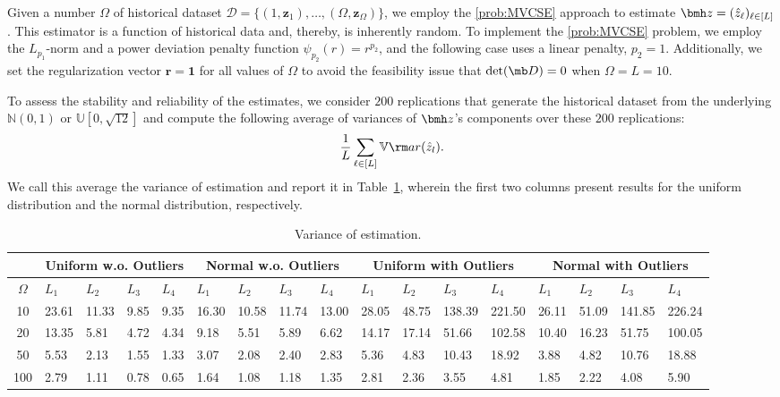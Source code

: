 \documentclass[mnsc, nonblindrev]{informswp}
\newcommand{\1}[1]{\mathds{1}{\left(#1\right)}}
\begin{document}
\begin{appendices}
Given a number $\Omega$ of historical dataset $\mathcal{D} = \{(1,\bm z_1), \dots, (\Omega,\bm z_\Omega)\}$, we employ the \ref{prob:MVCSE} approach to estimate $\bmh z = (\hat z_\ell)_{\ell \in [L]}$. This estimator is a function of historical data and, thereby, is inherently random. To implement the \ref{prob:MVCSE} problem, we employ the $L_{p_1}$-norm and a power deviation penalty function $\psi_{p_2}(r) = r^{p_2}$, and the following case uses a linear penalty, \ie $p_2 =1$. Additionally, we set the regularization vector $\bm r = \bm 1$ for all values of $\Omega$ to avoid the feasibility issue that $\det(\mb D) = 0$ when $\Omega = L = 10$.

To assess the stability and reliability of the estimates, we consider $200$ replications that generate the historical dataset from the underlying $\mathbb{N}(0,1)$ or $\mathbb{U}[0,\sqrt{12}]$ and compute the following average of variances of $\bmh z$'s components over these $200$ replications:
\[
\frac{1}{L} \sum_{\ell \in [L]} \mathbb{V}{\rm ar}(\hat{z}_l).
\]
We call this average the variance of estimation and report it in Table~\ref{tab:estimation_normal_uniform}, wherein the first two columns present results for the uniform distribution and the normal distribution, respectively. 

\begin{table}[htb]
\scriptsize
\centering
\begin{tabularx}{1.0\textwidth}
{>{\hspace{-5pt}}c<{\hspace{-3pt}}||XXXX|XXXX|XXXX|XXXX}
\hline \hline
&\multicolumn{4}{c|}{Uniform w.o. Outliers} & \multicolumn{4}{c|}{Normal w.o. Outliers} &\multicolumn{4}{c|}{Uniform with Outliers} & \multicolumn{4}{c}{Normal with Outliers}  \\
\cline{2-17}
$\Omega$ & $L_1$ & $L_{2}$ & $L_3$ & $L_{4}$ & $L_1$ & $L_{2}$ & $L_3$ & $L_{4}$ & $L_1$ & $L_{2}$ & $L_3$ & $L_{4}$ & $L_1$ & $L_{2}$ & $L_3$ & $L_{4}$   \\
\hline
10  & 23.61   & 11.33 & 9.85 & 9.35 & 16.30  & 10.58 & 11.74 & 13.00 & 28.05             & 48.75 & 138.39 & 221.50 & 26.11            & 51.09 & 141.85 & 226.24 \\
20  & 13.35   & 5.81  & 4.72 & 4.34 & 9.18   & 5.51  & 5.89  & 6.62  & 14.17             & 17.14 & 51.66  & 102.58 & 10.40            & 16.23 & 51.75  & 100.05 \\
50  & 5.53    & 2.13  & 1.55 & 1.33 & 3.07   & 2.08  & 2.40  & 2.83  & 5.36              & 4.83  & 10.43  & 18.92  & 3.88             & 4.82  & 10.76  & 18.88  \\
100 & 2.79    & 1.11  & 0.78 & 0.65 & 1.64   & 1.08  & 1.18  & 1.35  & 2.81              & 2.36  & 3.55   & 4.81   & 1.85             & 2.22  & 4.08   & 5.90   \\
\hline \hline
\end{tabularx}
\vspace{4 pt}
\caption{Variance of estimation.}
\label{tab:estimation_normal_uniform}
\end{table}


\end{appendices}
\end{document}

